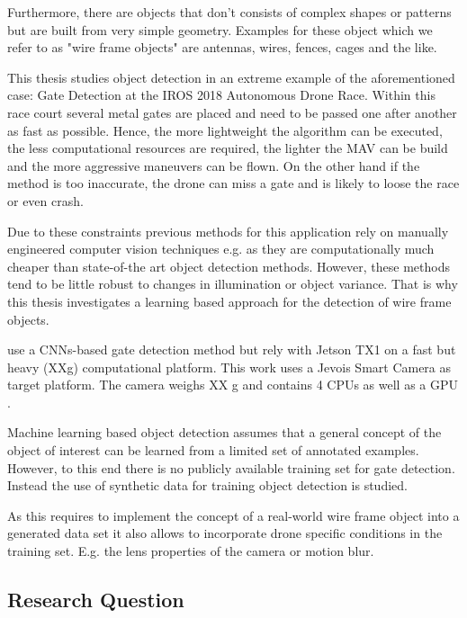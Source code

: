 Furthermore, there are objects that don't consists of complex shapes or patterns but are built from very simple geometry. Examples for these object which we refer to as "wire frame objects" are antennas, wires, fences, cages and the like.  

This thesis studies object detection in an extreme example of the aforementioned case: Gate Detection at the IROS 2018 Autonomous Drone Race. Within this race court several metal gates are placed and need to be passed one after another as fast as possible. Hence, the more lightweight the algorithm can be executed, the less computational resources are required, the lighter the \ac{MAV} can be build and the more aggressive maneuvers can be flown. On the other hand if the method is too inaccurate, the drone can miss a gate and is likely to loose the race or even crash.

Due to these constraints previous methods for this application rely on manually engineered computer vision techniques e.g. as they are computationally much cheaper than state-of-the art object detection methods. However, these methods tend to be little robust to changes in illumination or object variance. That is why this thesis investigates a learning based approach for the detection of wire frame objects.

 use a \acp{CNN}-based gate detection method but rely with Jetson TX1 on a fast but heavy (XXg) computational platform. This work uses a Jevois Smart Camera  as target platform. The camera weighs XX g and contains 4 CPUs as well as a GPU .

Machine learning based object detection assumes that a general concept of the object of interest can be learned from a limited set of annotated examples. However,  to this end there is no publicly available training set for gate detection. Instead the use of synthetic data for training object detection is studied. 

As this requires to implement the concept of a real-world wire frame object into a generated data set it also allows to incorporate drone specific conditions in the training set. E.g. the lens properties of the camera or motion blur.

\subsection*{Research Question}

